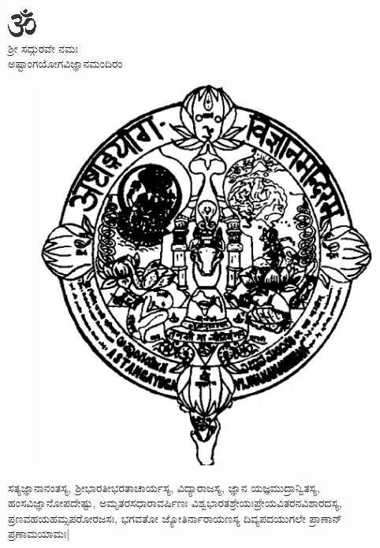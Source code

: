 

\newpage

\begin{center}
{\includegraphics[scale=1]{om.eps}}\\[5pt]

{\normalsize ಶ್ರೀ ಸದ್ಗುರವೇ ನಮಃ }\\[5pt]

{\large ಅಷ್ಟಾಂಗಯೋಗವಿಜ್ಞಾನಮಂದಿರಂ}
\end{center}

\vskip -20pt

\begin{figure}[h]
\centerline
{\includegraphics[scale=.18]{0000d.eps}}
\end{figure}

ಸತ್ಯಜ್ಞಾನಾನಂತಸ್ಯ, ಶ್ರೀಭಾರತೀಭರತಾಚಾರ್ಯಸ್ಯ, ವಿದ್ಯಾರಾಜಸ್ಯ, ಜ್ಞಾನ ಯಜ್ಞಮುದ್ರಾನ್ವಿತಸ್ಯ, ಹಂಸವಿಜ್ಞಾನೋಪದೇಷ್ಟು, ಅಮೃತರಸಧಾರಾವರ್ಷಿಣಃ ವಿಶ್ವಭಾರತಶ್ರೇಯಃಪ್ರೇಯವಿತರನವಿಶಾರದಸ್ಯ, ಪ್ರಣವಹಯಹಮ್ಸಪರೋರಜಸಃ, ಭಗವತೋ ಜ್ಯೋತಿರ್ನಾರಾಯಣಸ್ಯ ದಿವ್ಯಪದಯುಗಲೇ ಪ್ರಾಣಾನ್ ಪ್ರಣಾಮಯಾಮಃ|

